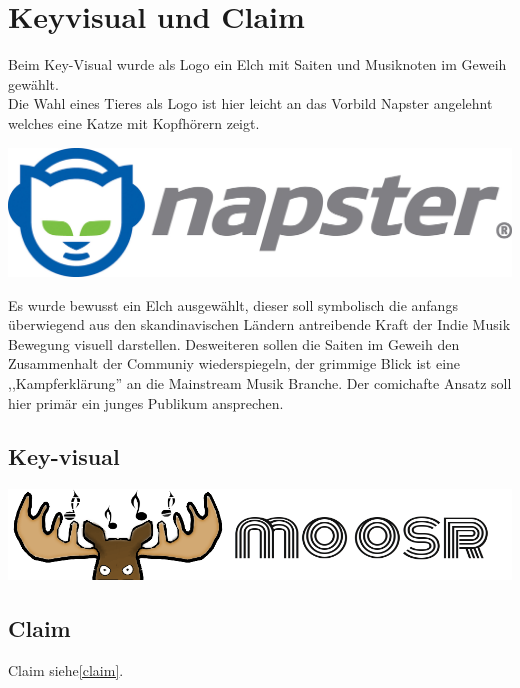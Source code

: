 
\chapter{Keyvisual und Claim}
Beim Key-Visual wurde als Logo ein Elch mit Saiten und Musiknoten im Geweih
gewählt.
\\
Die Wahl eines Tieres als Logo ist hier leicht an das Vorbild Napster
angelehnt welches eine Katze mit Kopfhörern zeigt.

\begin{center}
    \includegraphics[scale=0.4]{./gfx/napster.jpeg}
\end{center}

Es wurde bewusst ein Elch
ausgewählt, dieser soll symbolisch die anfangs überwiegend aus den
skandinavischen Ländern antreibende Kraft der Indie Musik Bewegung visuell
darstellen. Desweiteren sollen die Saiten im Geweih den Zusammenhalt der
Communiy wiederspiegeln, der grimmige Blick ist eine ,,Kampferklärung'' an die
Mainstream Musik Branche. Der comichafte Ansatz soll hier primär ein junges
Publikum ansprechen.
\section{Key-visual}

\begin{center}
    \includegraphics[scale=0.4]{./gfx/elchlogo.png}
\end{center}
\section{Claim}
Claim siehe\ref{claim}.
